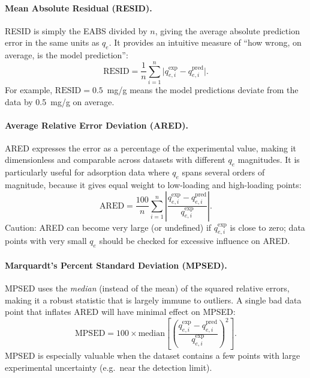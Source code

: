 	\paragraph{Mean Absolute Residual (RESID).}
	RESID is simply the EABS divided by $n$, giving the average
	absolute prediction error in the same units as $q_e$. It
	provides an intuitive measure of ``how wrong, on average, is
	the model prediction'':
	\begin{equation}
		\mathrm{RESID}
		= \frac{1}{n}\sum_{i=1}^{n}
		\bigl|q_{e,i}^{\exp} - q_{e,i}^{\mathrm{pred}}\bigr|.
		\label{eq:RESID}
	\end{equation}
	For example, $\mathrm{RESID} = 0.5$~mg/g means the model
	predictions deviate from the data by 0.5~mg/g on average.

	\paragraph{Average Relative Error Deviation (ARED).}
	ARED expresses the error as a percentage of the experimental
	value, making it dimensionless and comparable across datasets
	with different $q_e$ magnitudes. It is particularly useful for
	adsorption data where $q_e$ spans several orders of magnitude,
	because it gives equal weight to low-loading and high-loading
	points:
	\begin{equation}
		\mathrm{ARED}
		= \frac{100}{n}\sum_{i=1}^{n}
		\left|
		\frac{q_{e,i}^{\exp} - q_{e,i}^{\mathrm{pred}}}
		{q_{e,i}^{\exp}}
		\right|.
		\label{eq:ARED}
	\end{equation}
	Caution: ARED can become very large (or undefined) if
	$q_{e,i}^{\exp}$ is close to zero; data points with very small
	$q_e$ should be checked for excessive influence on ARED.

	\paragraph{Marquardt's Percent Standard Deviation (MPSED).}
	MPSED uses the \emph{median} (instead of the mean) of the
	squared relative errors, making it a robust statistic that is
	largely immune to outliers. A single bad data point that
	inflates ARED will have minimal effect on MPSED:
	\begin{equation}
		\mathrm{MPSED}
		= 100 \times \mathrm{median}\!\left[
		\left(
		\frac{q_{e,i}^{\exp} - q_{e,i}^{\mathrm{pred}}}
		{q_{e,i}^{\exp}}
		\right)^{\!2}
		\right].
		\label{eq:MPSED}
	\end{equation}
	MPSED is especially valuable when the dataset contains a few
	points with large experimental uncertainty (e.g.\ near the
	detection limit).


